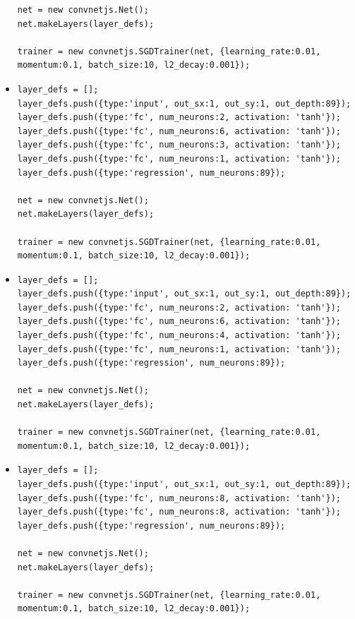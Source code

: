 \begin{itemize}
\begin{verbatim}
net = new convnetjs.Net();
net.makeLayers(layer_defs);

trainer = new convnetjs.SGDTrainer(net, {learning_rate:0.01, 
momentum:0.1, batch_size:10, l2_decay:0.001});
\end{verbatim}

\item \begin{verbatim}
layer_defs = [];
layer_defs.push({type:'input', out_sx:1, out_sy:1, out_depth:89});
layer_defs.push({type:'fc', num_neurons:2, activation: 'tanh'});
layer_defs.push({type:'fc', num_neurons:6, activation: 'tanh'});
layer_defs.push({type:'fc', num_neurons:3, activation: 'tanh'});
layer_defs.push({type:'fc', num_neurons:1, activation: 'tanh'});
layer_defs.push({type:'regression', num_neurons:89});

net = new convnetjs.Net();
net.makeLayers(layer_defs);

trainer = new convnetjs.SGDTrainer(net, {learning_rate:0.01, 
momentum:0.1, batch_size:10, l2_decay:0.001});
\end{verbatim}

\item \begin{verbatim}
layer_defs = [];
layer_defs.push({type:'input', out_sx:1, out_sy:1, out_depth:89});
layer_defs.push({type:'fc', num_neurons:2, activation: 'tanh'});
layer_defs.push({type:'fc', num_neurons:6, activation: 'tanh'});
layer_defs.push({type:'fc', num_neurons:4, activation: 'tanh'});
layer_defs.push({type:'fc', num_neurons:1, activation: 'tanh'});
layer_defs.push({type:'regression', num_neurons:89});

net = new convnetjs.Net();
net.makeLayers(layer_defs);

trainer = new convnetjs.SGDTrainer(net, {learning_rate:0.01, 
momentum:0.1, batch_size:10, l2_decay:0.001});
\end{verbatim}


\item \begin{verbatim}
layer_defs = [];
layer_defs.push({type:'input', out_sx:1, out_sy:1, out_depth:89});
layer_defs.push({type:'fc', num_neurons:8, activation: 'tanh'});
layer_defs.push({type:'fc', num_neurons:8, activation: 'tanh'});
layer_defs.push({type:'regression', num_neurons:89});

net = new convnetjs.Net();
net.makeLayers(layer_defs);

trainer = new convnetjs.SGDTrainer(net, {learning_rate:0.01, 
momentum:0.1, batch_size:10, l2_decay:0.001});
\end{verbatim}
\end{itemize}